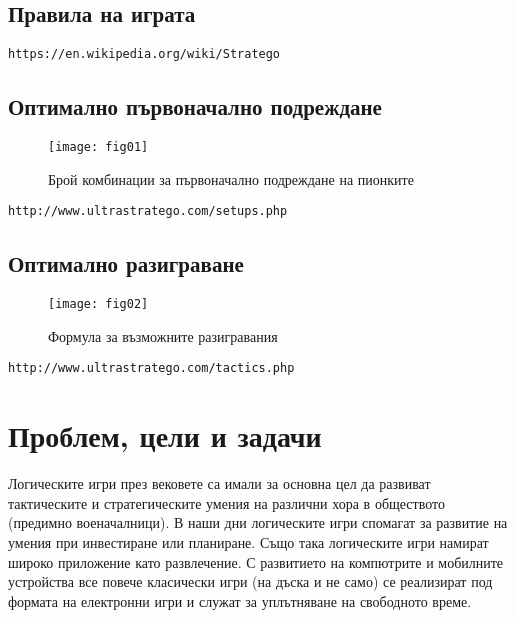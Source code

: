 \subsection{Правила на играта}

\begin{lstlisting}
https://en.wikipedia.org/wiki/Stratego
\end{lstlisting}

\subsection{Оптимално първоначално подреждане}

\begin{figure}[h!]
 \centering
 \texttt{[image: fig01]}
 \caption{Брой комбинации за първоначално подреждане на пионките \cite{arts01}}
\label{figure01}
\end{figure}
\FloatBarrier

\begin{lstlisting}
http://www.ultrastratego.com/setups.php
\end{lstlisting}

\subsection{Оптимално разиграване}

\begin{figure}[h!]
 \centering
 \texttt{[image: fig02]}
 \caption{Формула за възможните разигравания \cite{arts01}}
\label{figure02}
\end{figure}
\FloatBarrier

\begin{lstlisting}
http://www.ultrastratego.com/tactics.php
\end{lstlisting}

\section{Проблем, цели и задачи}

Логическите игри през вековете са имали за основна цел да развиват тактическите и стратегическите умения на различни хора в обществото (предимно военачалници). В наши дни логическите игри спомагат за развитие на умения при инвестиране или планиране. Също така логическите игри намират широко приложение като развлечение. С развитието на компютрите и мобилните устройства все повече класически игри (на дъска и не само) се реализират под формата на електронни игри и служат за уплътняване на свободното време. 

